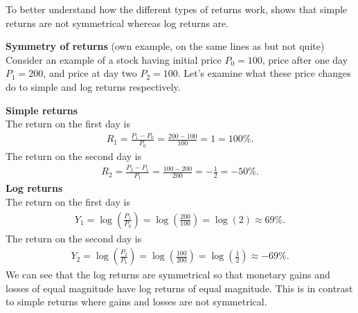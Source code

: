 To better understand how the different types of returns work,  shows that simple returns are not symmetrical whereas log returns are. 
\begin{example}\label{ex:returnSymmetry}
    \textbf{Symmetry of returns} (own example, on the same lines as \citet[p.~4]{Danielsson2011} but not quite)
    Consider an example of a stock having initial price $P_0 = 100$, price after one day $P_1 = 200$, and price at day two $P_2 = 100$. Let's examine what these price changes do to simple and log returns respectively.
    
    \textbf{Simple returns}\\
    The return on the first day is
    \begin{align*}
        R_1 = \frac{P_1-P_0}{P_0} = \frac{200-100}{100} = 1 = 100\%.
    \end{align*}
    The return on the second day is
    \begin{align*}
        R_2 = \frac{P_2-P_1}{P_1} = \frac{100-200}{200} = -\frac{1}{2} = -50\%.
    \end{align*}    
    \textbf{Log returns}\\
    The return on the first day is 
    \begin{align*}
       Y_1 = \log \left( \frac{P_1}{P_0}\right) = \log\left(\frac{200}{100}\right)  = \log(2) \approx 69 \%.
    \end{align*}
    The return on the second day is
    \begin{align*}
        Y_2 = \log\left(\frac{P_2}{P_1}\right) = \log\left(\frac{100}{200}\right)= \log\left(\frac{1}{2}\right) \approx -69\%.
    \end{align*}
    We can see that the log returns are symmetrical so that monetary gains and losses of equal magnitude have log returns of equal magnitude. This is in contrast to simple returns where gains and losses are not symmetrical.
\end{example}




